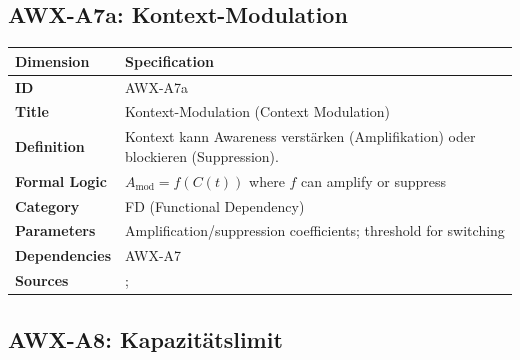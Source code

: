 
\subsection{AWX-A7a: Kontext-Modulation}

\begin{table}[htbp]
\small
\begin{tabular}{p{3cm}p{11cm}}
\toprule
\textbf{Dimension} & \textbf{Specification} \\
\midrule
\textbf{ID} & AWX-A7a \\
\textbf{Title} & Kontext-Modulation (Context Modulation) \\
\textbf{Definition} & Kontext kann Awareness verstärken (Amplifikation) oder blockieren (Suppression). \\
\textbf{Formal Logic} & $A_{\text{mod}} = f(C(t))$ where $f$ can amplify or suppress \\
\textbf{Category} & FD (Functional Dependency) \\
\textbf{Parameters} & Amplification/suppression coefficients; threshold for switching \\
\textbf{Dependencies} & AWX-A7 \\
\textbf{Sources} & \citet{PAP-bordalo2012salience}; \citet{PAP-koszegi2006model} \\
\bottomrule
\end{tabular}
\end{table}


\subsection{AWX-A8: Kapazitätslimit}

